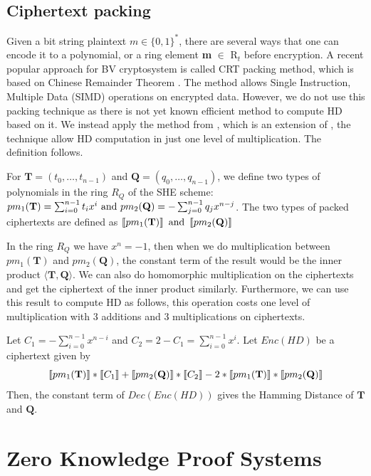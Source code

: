 \subsection{Ciphertext packing}
\label{sub:ciphertext_packing}
Given a bit string plaintext $m \in \{0,1\}^*$, there are several ways that one
can encode it to a polynomial, or a ring element \textbf{m} $\in$ R$_{t}$ before
encryption. A recent popular approach for BV cryptosystem is called CRT packing
method, which is based on Chinese Remainder Theorem \cite{smart2014fully}. The
method allows Single Instruction, Multiple Data (SIMD) operations on encrypted
data. However, we do not use this packing technique as there is not yet known
efficient method to compute HD based on it. We instead apply the method from
\cite{yasuda2014practical}, which is an extension of \cite{EPRINT:LauNaeVai11},
the technique allow HD computation in just one level of multiplication. The
definition follows.
\begin{definition}
  For $\mathbf{T} = (t_0, \dots, t_{n-1})$ and
  $\mathbf{Q} = (q_0, \dots, q_{n-1})$, we define two types of polynomials in
  the ring $R_Q$ of the SHE scheme:
  $ pm_1(\mathbf{T}) = \sum_{i=0}^{n-1}t_ix^i \ \textnormal{and} \
  pm_2(\mathbf{Q}) = - \sum_{j=0}^{n-1}q_jx^{n-j} $.  The two types of packed
  ciphertexts are defined as
  $ \left\llbracket pm_{1}(\mathbf{T})\right\rrbracket \textnormal{ and } \left\llbracket pm_2(\mathbf{Q})\right\rrbracket $
\end{definition}
In the ring $R_Q$ we have $x^n = -1$, then when we do multiplication between
$pm_1(\mathbf{T})$ and $pm_2(\mathbf{Q})$, the constant term of the result would
be the inner product $\langle \mathbf{T}, \mathbf{Q}\rangle$. We can also do
homomorphic multiplication on the ciphertexts and get the ciphertext of the
inner product similarly. Furthermore, we can use this result to compute HD as
follows, this operation costs one level of multiplication with 3 additions and 3
multiplications on ciphertexts.

\begin{theorem}
  \label{theo:HDComputation}
  Let $C_1 = - \sum_{i=0}^{n-1}x^{n-i}$ and
  $C_2 = 2 - C_1 = \sum_{i=0}^{n-1}x^i$. Let $Enc(HD)$ be a ciphertext given by
  \[
    \left\llbracket pm_{1}(\mathbf{T})\right\rrbracket*\left\llbracket C_1 \right\rrbracket + \left\llbracket pm_{2}(\mathbf{Q})\right\rrbracket*
    \left\llbracket C_2 \right\rrbracket - 2*\left\llbracket pm_{1}(\mathbf{T})\right\rrbracket*\left\llbracket pm_{2}(\mathbf{Q})\right\rrbracket
  \]
  Then, the constant term of $Dec(Enc(HD))$ gives the Hamming Distance of
  $\mathbf{T}$ and $\mathbf{Q}$.
\end{theorem}
\section{Zero Knowledge Proof Systems}
\label{sec:defZKP}
